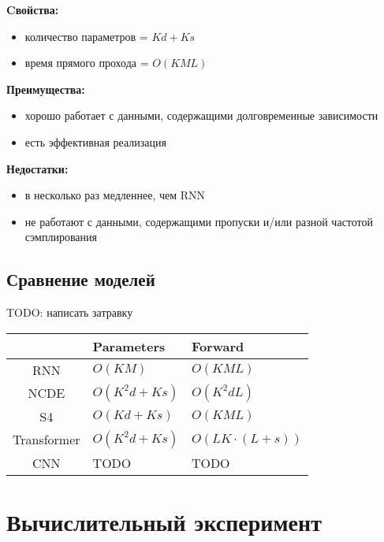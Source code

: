 \documentclass[a4paper, 12pt]{article}
\begin{document}
	\textbf{Cвойства:}
	\begin{itemize}
		\item количество параметров = $Kd + Ks$
		\item время прямого прохода = $O(KML)$
	\end{itemize}

	\textbf{Преимущества:}
	\begin{itemize}
		\item хорошо работает с данными, содержащими долговременные зависимости
		\item есть эффективная реализация \citep{s4-git}
	\end{itemize}
	
	\textbf{Недостатки:}
	\begin{itemize}
		\item в несколько раз медленнее, чем RNN
		\item не работают с данными, содержащими пропуски и/или разной частотой сэмплирования
	\end{itemize}

	\subsection{Сравнение моделей}
	TODO: написать затравку
	
	\begin{table}[bhtp]
		\begin{tabular}{c|l|l|}
			\cline{2-3}
			\multicolumn{1}{l|}{}             & Parameters & Forward \\ \hline
			\multicolumn{1}{|c|}{RNN}         & $O(KM)$ & $O(KML)$ \\ \hline
			\multicolumn{1}{|c|}{NCDE}  & $O(K^2d + Ks)$ & $O(K^2dL)$ \\ \hline
			\multicolumn{1}{|c|}{S4}          & $O(Kd + Ks)$ & $O(KML)$ \\ \hline
			\multicolumn{1}{|c|}{Transformer} & $O(K^2d + Ks)$ & $O(LK \cdot (L+s))$ \\ \hline
			\multicolumn{1}{|c|}{CNN} & TODO & TODO \\ \hline
		\end{tabular}
	\end{table}

	
	\newpage
	\section{Вычислительный эксперимент}
	
\end{document}
